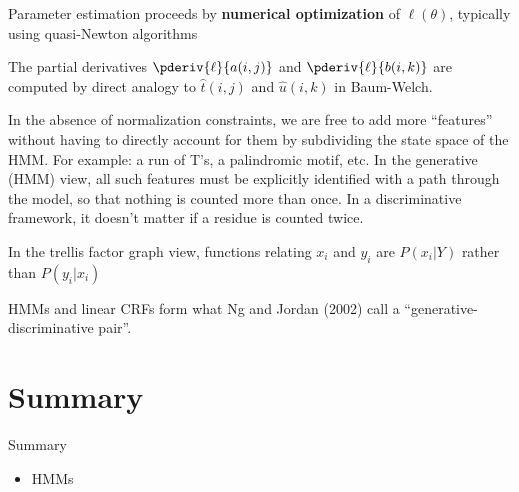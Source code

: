 \documentclass{beamer}
\begin{document}
\begin{frame}
\itemb
\item Parameter estimation proceeds by {\bf numerical optimization} of $\ell(\theta)$, typically using quasi-Newton algorithms
\item The partial derivatives $\pderiv{\ell}{a(i,j)}$ and $\pderiv{\ell}{b(i,k)}$ are computed by direct analogy to $\hat{t}(i,j)$ and $\hat{u}(i,k)$ in Baum-Welch.
\iteme
\end{frame}{}

\begin{frame}
\itemb
\item In the absence of normalization constraints, we are free to add more ``features'' without having to directly account for them by subdividing the state space of the HMM.
For example: a run of T's, a palindromic motif, etc.
In the generative (HMM) view, all such features must be explicitly identified with a path through the model, so that nothing is counted more than once.
In a discriminative framework, it doesn't matter if a residue is counted twice.
\item In the trellis factor graph view, functions relating $x_i$ and $y_i$ are $P(x_i|Y)$ rather than $P(y_i|x_i)$
\item HMMs and linear CRFs form what Ng and Jordan (2002) call a ``generative-discriminative pair''.
\iteme

\end{frame}

\section*{Summary}

\begin{frame}{Summary}

  \begin{itemize}
  \item HMMs
  \end{itemize}

\end{frame}
\end{document}
